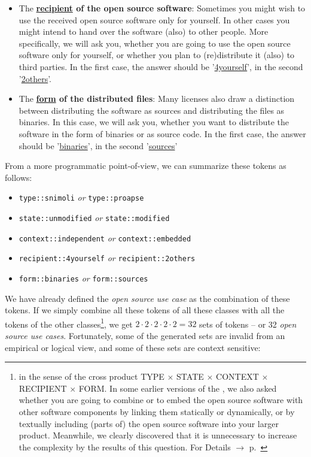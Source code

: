 \begin{itemize}
  \item The \textbf{\underline{recipient} of the open source software}:
  Sometimes you might wish to use the received open source software only for
  yourself. In other cases you might intend to hand over the software (also) to
  other people. More specifically, we will ask you, whether you are going to use
  the open source software only for yourself, or whether you plan to
  (re)distribute it (also) to third parties. In the first case, the answer
  should be '\underline{4yourself}', in the second '\underline{2others}'.
 
  \item The \textbf{\underline{form} of the distributed files}: Many licenses
  also draw a distinction between distributing the software as sources and
  distributing the files as binaries. In this case, we will ask you, whether you
  want to distribute the software in the form of binaries or as source code. In
  the first case, the answer should be '\underline{binaries}', in the second
  '\underline{sources}'
  
\end{itemize}

From a more programmatic point-of-view, we can summarize these tokens as
follows:

\begin{itemize}
  \item \texttt{type::snimoli} \emph{or} \texttt{type::proapse}
  \item \texttt{state::unmodified} \emph{or} \texttt{state::modified}
  \item \texttt{context::independent} \emph{or} \texttt{context::embedded}
  \item \texttt{recipient::4yourself} \emph{or} \texttt{recipient::2others}
  \item \texttt{form::binaries} \emph{or} \texttt{form::sources}
\end{itemize}

We have already defined the \emph{open source use case} as the combination of
these tokens. If we simply combine all these tokens of all these classes with
all the tokens of the other classes\footnote{in the sense of the cross product
TYPE $\times$ STATE $\times$ CONTEXT $\times$ RECIPIENT $\times$ FORM. In some
earlier versions of the \oslic{}, we also asked whether you are going to combine or
to embed the open source software with other software components by linking them
statically or dynamically, or by textually including (parts of) the open source
software into your larger product. Meanwhile, we clearly discovered that it is
unnecessary to increase the complexity by the results of this question. For
Details $\rightarrow$ \oslic{} p.\ \pageref{sec:LinkingSecondary}}, we get
$2 \cdot 2 \cdot 2 \cdot 2 \cdot 2 = 32$ sets of tokens -- or 32 \emph{open source use cases}.
Fortunately, some of the generated sets are invalid from an empirical or logical
view, and some of these sets are context sensitive:

